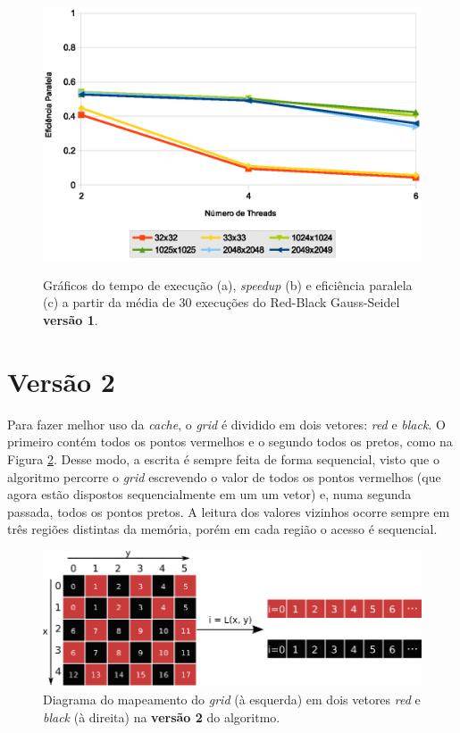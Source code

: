 \begin{figure}[H]
    \begin{minipage}{.5\textwidth}
        \includegraphics[width=\textwidth]{figures/efficiency-v1}
        \label{subfig:efficiency-v1}
    \end{minipage}%

    \caption{Gráficos do tempo de execução (a), \textit{speedup} (b) e eficiência paralela (c) a partir da média de 30 execuções do Red-Black Gauss-Seidel \textbf{versão 1}.}
    \label{fig:perf-v1}
\end{figure}

\section{Versão 2}
\label{sec:gs-version2}

Para fazer melhor uso da \textit{cache}, o \textit{grid} é dividido em dois vetores: \textit{red} e \textit{black}. O primeiro contém todos os pontos vermelhos e o segundo todos os pretos, como na Figura \ref{fig:grid-v2}. Desse modo, a escrita é sempre feita de forma sequencial, visto que o algoritmo percorre o \textit{grid} escrevendo o valor de todos os pontos vermelhos (que agora estão dispostos sequencialmente em um um vetor) e, numa segunda passada, todos os pontos pretos.  A leitura dos valores vizinhos ocorre sempre em três regiões distintas da memória, porém em cada região o acesso é sequencial.

\begin{figure}[h]
    \centering
    \includegraphics[width=.8\textwidth]{figures/grid-v2}

    \caption{Diagrama do mapeamento do \textit{grid} (à esquerda) em dois vetores \textit{red} e \textit{black} (à direita) na \textbf{versão 2} do algoritmo.}
    \label{fig:grid-v2}
\end{figure}

